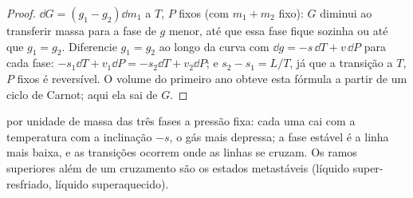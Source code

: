 \begin{proof}
$\dd G = (g_1 - g_2)\dd m_1$ a $T$, $P$ fixos (com $m_1 + m_2$ fixo):
$G$ diminui ao transferir massa para a fase de $g$ menor, até que essa
fase fique sozinha ou até que $g_1 = g_2$. Diferencie $g_1 = g_2$ ao longo da
curva com $\dd g = -s\,\dd T + v\,\dd P$ para cada fase: $-s_1\dd T +
v_1\dd P = -s_2\dd T + v_2\dd P$; e $s_2 - s_1 = L/T$, já que a transição
a $T$, $P$ fixos é reversível. O volume do primeiro ano obteve esta fórmula
a partir de um ciclo de Carnot; aqui ela sai de $G$.
\end{proof}

\begin{omfigure}

{\small {} por unidade de massa das três fases a pressão
fixa: cada uma cai com a temperatura com a inclinação $-s$, o gás
mais depressa; a fase estável é a linha mais baixa, e as transições ocorrem
onde as linhas se cruzam. Os ramos superiores além de um cruzamento são os
estados metastáveis (líquido super-resfriado, líquido superaquecido).}
\end{omfigure}

